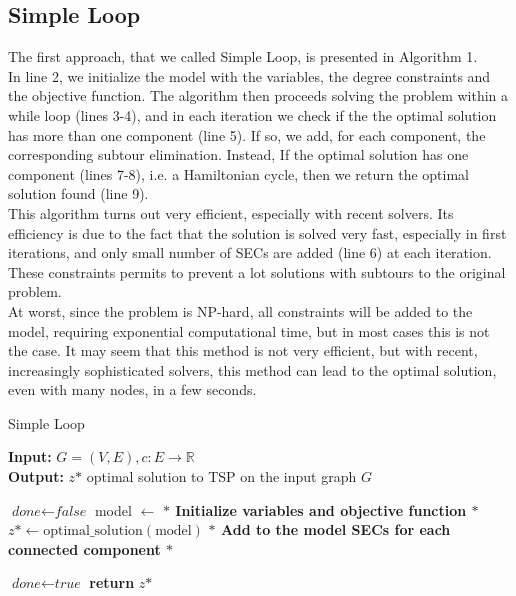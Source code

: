 \subsection{Simple Loop}
The first approach, that we called Simple Loop, is presented in Algorithm 1.
\\ In line 2, we initialize the model with the variables, the degree constraints and the objective function. 
The algorithm then proceeds solving the problem within a while loop (lines 3-4), and in each iteration we check if the the optimal solution has more than one component (line 5). If so, we add, for each component, the corresponding subtour elimination. Instead, If the optimal solution has one component (lines 7-8), i.e. a Hamiltonian cycle, then we return the optimal solution found (line 9).
\\ This algorithm turns out very efficient, especially with recent solvers. Its efficiency is due to the fact that the solution is solved very fast, especially in first iterations, and only small number of SECs are added (line 6) at each iteration. These constraints permits to prevent a lot solutions with subtours to the original problem. 
\\ At worst, since the problem is NP-hard, all constraints will be added to the model, requiring exponential computational time, but in most cases this is not the case.
It may seem that this method is not very efficient, but with recent, increasingly sophisticated solvers, this method can lead to the optimal solution, even with many nodes, in a few seconds.
\begin{algorithm}
    \caption{Simple Loop}\label{Loop Method}
    \hspace*{\algorithmicindent} \textbf{Input:} $G = (V,E) , c : E \rightarrow \mathbb{R}$\\
    \hspace*{\algorithmicindent} \textbf{Output:} $z \text{*} $ optimal solution to TSP on the input graph $G$
    \begin{algorithmic}[1]
    \State $\textit{done} \gets \textit{false}$
    \State model $ \leftarrow $ \textbf{$\ast$ Initialize variables and objective function $\ast$ }
    	\State $z \text{*} \gets \text{optimal\_solution}(\text{model})$\;
	\State \textbf{ $\ast$ Add to the model SECs for each connected component $\ast$ }
	
	\Else \State $\textit{done} \gets \textit{true}$
	\EndIf	
    \EndWhile
    \State \textbf{return} $z \text{*} $
    \end{algorithmic}
    \end{algorithm}
\noindent
